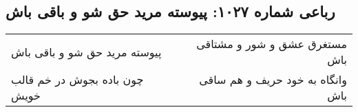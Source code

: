\begin{center}
\section*{رباعی شماره ۱۰۲۷: پیوسته مرید حق شو و باقی باش}
\label{sec:1027}
\begin{longtable}{l p{0.5cm} r}
پیوسته مرید حق شو و باقی باش
&&
مستغرق عشق و شور و مشتاقی باش
\\
چون باده بجوش در خم قالب خویش
&&
وانگاه به خود حریف و هم ساقی باش
\\
\end{longtable}
\end{center}
